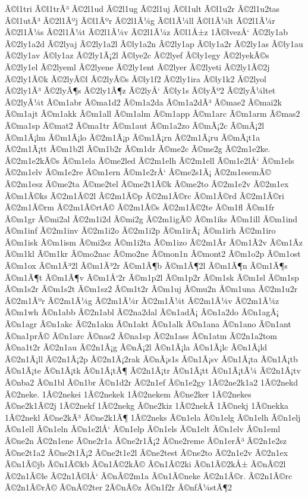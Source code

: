 {Ã©l1tri
Ã©l1trÃ³
Ã©2l1ud
Ã©2l1ug
Ã©2l1uj
Ã©l1ult
Ã©l1u2r
Ã©2l1u2tas
Ã©l1utÃ³
Ã©2l1Ãºj
Ã©l1Ãºr
Ã©2l1Ã¼g
Ã©l1Ã¼ll
Ã©l1Ã¼lt
Ã©2l1Ã¼r
Ã©2l1Ã¼s
Ã©2l1Ã¼t
Ã©2l1Ã¼v
Ã©2l1Ã¼z
Ã©l1Å±z
1Ã©lvezÅ‘
Ã©2ly1ab
Ã©2ly1a2d
Ã©2lyaj
Ã©2ly1a2l
Ã©ly1a2n
Ã©2ly1ap
Ã©ly1a2r
Ã©2ly1as
Ã©ly1au
Ã©2ly1av
Ã©ly1az
Ã©2ly1Ã¡2l
Ã©lye2c
Ã©2lyef
Ã©ly1egy
Ã©2lyekÃ©s
Ã©2ly1el
Ã©2lyeml
Ã©2lyene
Ã©2ly1ent
Ã©2lyer
Ã©2lyeti
Ã©2ly1Ã©2j
Ã©2ly1Ã©k
Ã©2lyÃ©l
Ã©2lyÃ©s
Ã©ly1f2
Ã©2ly1ira
Ã©ly1k2
Ã©2lyol
Ã©2ly1Ã³
Ã©2lyÃ¶s
Ã©2ly1Ã¶z
Ã©2lyÅ‘
Ã©ly1s
Ã©lyÃº2
Ã©2lyÃ¼ltet
Ã©2lyÃ¼t
Ã©m1abr
Ã©ma1d2
Ã©m1a2da
Ã©m1a2dÃ³
Ã©mae2
Ã©mai2k
Ã©m1ajt
Ã©m1akk
Ã©m1all
Ã©m1alm
Ã©m1app
Ã©m1arc
Ã©m1arm
Ã©mas2
Ã©ma1sp
Ã©mat2
Ã©ma1tr
Ã©m1aut
Ã©m1a2zo
Ã©mÃ¡2c
Ã©mÃ¡2l
Ã©m1Ã¡lm
Ã©m1Ã¡lo
Ã©2m1Ã¡p
Ã©m1Ã¡rn
Ã©2m1Ã¡ru
Ã©mÃ¡t1a
Ã©2m1Ã¡tt
Ã©m1b2l
Ã©m1b2r
Ã©m1dr
Ã©me2c
Ã©me2g
Ã©2m1e2ke.
Ã©2m1e2kÃ©s
Ã©m1ela
Ã©me2led
Ã©2m1elh
Ã©2m1ell
Ã©m1e2lÅ‘
Ã©m1els
Ã©2m1elv
Ã©m1e2re
Ã©m1ern
Ã©m1e2rÅ‘
Ã©me2s1Ã¡
Ã©2m1esemÃ©
Ã©2m1esz
Ã©me2ta
Ã©me2tel
Ã©me2t1Ã©k
Ã©me2to
Ã©2m1e2v
Ã©2m1ex
Ã©m1Ã©ks
Ã©2m1Ã©2l
Ã©2m1Ã©p
Ã©2m1Ã©rc
Ã©m1Ã©rd
Ã©2m1Ã©ri
Ã©2m1Ã©rm
Ã©2m1Ã©rtÃ©
Ã©2m1Ã©s
Ã©2m1Ã©2te
Ã©m1fl
Ã©m1fr
Ã©m1gr
Ã©mi2al
Ã©2m1i2d
Ã©mi2g
Ã©2m1igÃ©
Ã©m1iks
Ã©m1ill
Ã©m1ind
Ã©m1inf
Ã©2m1inv
Ã©2m1i2o
Ã©2m1i2p
Ã©m1irÃ¡
Ã©m1irh
Ã©2m1iro
Ã©m1isk
Ã©m1ism
Ã©mi2sz
Ã©m1i2ta
Ã©m1izo
Ã©2m1Ã­r
Ã©m1Ã­2v
Ã©m1Ã­z
Ã©m1kl
Ã©m1kr
Ã©mo2nac
Ã©mo2ne
Ã©mon1n
Ã©mont2
Ã©m1o2p
Ã©m1ost
Ã©m1ox
Ã©m1Ã³2l
Ã©m1Ã³2r
Ã©m1Ã¶b
Ã©m1Ã¶2l
Ã©m1Ã¶n
Ã©m1Ã¶s
Ã©m1Ã¶t
Ã©m1Ã¶v
Ã©m1Å‘2r
Ã©m1p2l
Ã©m1p2r
Ã©m1sk
Ã©m1sl
Ã©m1sp
Ã©m1s2r
Ã©m1s2t
Ã©m1sz2
Ã©m1t2r
Ã©m1uj
Ã©mu2n
Ã©m1una
Ã©2m1u2r
Ã©2m1Ãºr
Ã©2m1Ã¼g
Ã©2m1Ã¼r
Ã©2m1Ã¼t
Ã©2m1Ã¼v
Ã©2m1Ã¼z
Ã©m1wh
Ã©n1abb
Ã©2n1abl
Ã©2na2dal
Ã©n1adÃ¡
Ã©n1a2do
Ã©n1agÃ¡
Ã©n1agr
Ã©n1akc
Ã©2n1akn
Ã©n1akt
Ã©n1alk
Ã©n1ana
Ã©n1ano
Ã©n1ant
Ã©na1prÃ©
Ã©n1arc
Ã©nas2
Ã©na1sp
Ã©2n1ass
Ã©n1atm
Ã©2n1a2tom
Ã©na1t2r
Ã©2n1au
Ã©2n1Ã¡g
Ã©nÃ¡2l
Ã©n1Ã¡la
Ã©n1Ã¡lc
Ã©n1Ã¡ld
Ã©2n1Ã¡ll
Ã©2n1Ã¡2p
Ã©2n1Ã¡2rak
Ã©nÃ¡s1s
Ã©n1Ã¡sv
Ã©n1Ã¡ta
Ã©n1Ã¡tb
Ã©n1Ã¡te
Ã©n1Ã¡tk
Ã©n1Ã¡tÃ¶
Ã©2n1Ã¡tr
Ã©n1Ã¡tt
Ã©n1Ã¡tÃ¼
Ã©2n1Ã¡tv
Ã©nba2
Ã©n1bl
Ã©n1br
Ã©n1d2r
Ã©2n1ef
Ã©n1e2gy
1Ã©2ne2k1a2
1Ã©2nekd
Ã©2neke.
1Ã©2nekei
1Ã©2nekek
1Ã©2nekem
Ã©ne2ker
1Ã©2nekes
Ã©ne2k1Ã©2j
1Ã©2nekf
1Ã©2nekg
Ã©ne2kiz
1Ã©2nekÃ­
1Ã©nekj
1Ã©nekka
1Ã©2nekl
Ã©ne2kÃ³
Ã©ne2k1Ã¶
1Ã©2neks
Ã©n1ela
Ã©n1elg
Ã©n1elh
Ã©n1elj
Ã©n1ell
Ã©n1eln
Ã©n1e2lÅ‘
Ã©n1elp
Ã©n1els
Ã©n1elt
Ã©n1elv
Ã©n1eml
Ã©ne2n
Ã©2n1ene
Ã©ne2r1a
Ã©ne2r1Ã¡2
Ã©ne2reme
Ã©n1erÃ³
Ã©2n1e2sz
Ã©ne2t1a2
Ã©ne2t1Ã¡2
Ã©ne2t1e2l
Ã©ne2test
Ã©ne2to
Ã©2n1e2v
Ã©2n1ex
Ã©n1Ã©jb
Ã©n1Ã©kb
Ã©n1Ã©2kÃ©
Ã©n1Ã©2ki
Ã©n1Ã©2kÅ±
Ã©nÃ©2l
Ã©2n1Ã©le
Ã©2n1Ã©lÅ‘
Ã©nÃ©2m1a
Ã©n1Ã©neke
Ã©2n1Ã©r.
Ã©2n1Ã©rc
Ã©2n1Ã©rÃ©
Ã©nÃ©2ter
2Ã©nÃ©z
Ã©n1f2r
Ã©nfÃ¼stÃ¶2
}
